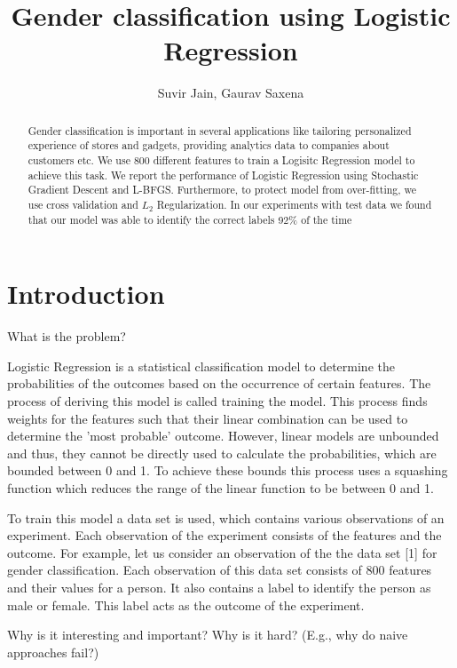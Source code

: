 \documentclass{acm_proc_article-sp}
\begin{document}
\title{Gender classification using Logistic Regression}

\author{
Suvir Jain,
Gaurav Saxena
}

\maketitle
\begin{abstract}
Gender classification is important in several applications like tailoring personalized experience of stores and gadgets, providing analytics data to companies about customers etc. We use 800 different features to train a Logisitc Regression model to achieve this task. We report the performance of Logistic Regression using Stochastic Gradient Descent and L-BFGS. Furthermore, to protect model from over-fitting, we use cross validation and $L_{2}$ Regularization. In our experiments with test data we found that our model was able to identify the correct labels 92\% of the time
\end{abstract}

\section{Introduction}

What is the problem?

Logistic Regression is a statistical classification model to determine the probabilities of the outcomes based on the occurrence of certain features. The process of deriving this model is called training the model. This process finds weights for the features such that their linear combination can be used to determine the 'most probable' outcome. However, linear models are unbounded and thus, they cannot be directly used to calculate the probabilities, which are bounded between 0 and 1. To achieve these bounds this process uses a squashing function which reduces the range of the linear function to be between 0 and 1.

To train this model a data set is used, which contains various observations of an experiment. Each observation of the experiment consists of the features and the outcome. For example, let us consider an observation of the the data set [1] for gender classification. Each observation of this data set consists of 800 features and their values for a person. It also contains a label to identify the person as male or female. This label acts as the outcome of the experiment.

Why is it interesting and important?
Why is it hard? (E.g., why do naive approaches fail?)
\end{document}
